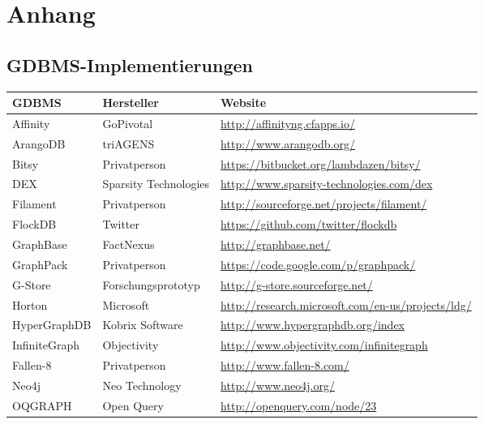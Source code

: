 \chapter{Anhang }
\label{cha:Anhang}

\section{GDBMS-Implementierungen}
\label{anh:vendor_list}

\renewcommand{\arraystretch}{1.25}
\begin{table}[h]
	\centering
	\begin{footnotesize}
   	\begin{tabular}{|m{2.5cm}|m{3.5cm}|>{\arraybackslash}m{9.5cm}|}
	\hline	
	\textbf{GDBMS} & \textbf{Hersteller} & \textbf{Website} \\
	\hline
   	Affinity 		& GoPivotal 			& \url{http://affinityng.cfapps.io/} \\
   	ArangoDB 		& triAGENS 				& \url{http://www.arangodb.org/} \\
   	Bitsy 			& Privatperson 			& \url{https://bitbucket.org/lambdazen/bitsy/} \\
   	DEX 			& Sparsity Technologies & \url{http://www.sparsity-technologies.com/dex} \\
   	Filament 		& Privatperson 			& \url{http://sourceforge.net/projects/filament/} \\
   	FlockDB 		& Twitter				& \url{https://github.com/twitter/flockdb} \\
   	GraphBase 		& FactNexus 			& \url{http://graphbase.net/} \\
   	GraphPack 		& Privatperson 			& \url{https://code.google.com/p/graphpack/} \\
   	G-Store 		& Forschungsprototyp	& \url{http://g-store.sourceforge.net/} \\
   	Horton 			& Microsoft 			& \url{http://research.microsoft.com/en-us/projects/ldg/} \\
   	HyperGraphDB 	& Kobrix Software		& \url{http://www.hypergraphdb.org/index} \\
   	InfiniteGraph 	& Objectivity			& \url{http://www.objectivity.com/infinitegraph} \\
   	Fallen-8 		& Privatperson 			& \url{http://www.fallen-8.com/} \\
   	Neo4j 			& Neo Technology 		& \url{http://www.neo4j.org/} \\
   	OQGRAPH 		& Open Query 			& \url{http://openquery.com/node/23} \\

\end{tabular}
\end{footnotesize}
\end{table}
